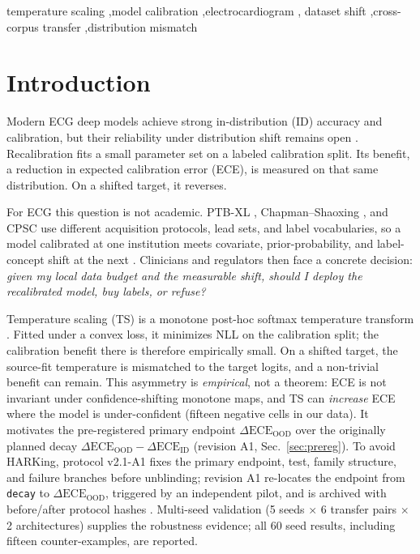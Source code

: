 \documentclass[final,5p,times,nonatbib]{elsarticle}
\begin{document}
\begin{frontmatter}
\begin{keyword}
temperature scaling \sep model calibration \sep electrocardiogram \sep
dataset shift \sep cross-corpus transfer \sep distribution mismatch
\end{keyword}

\end{frontmatter}



\section{Introduction}
\label{sec:intro}
Modern ECG deep models achieve strong in-distribution (ID) accuracy and
calibration, but their reliability under distribution shift remains open
\cite{ovadia2019calibration,guo2017calibration,wagner2020ptbxl}.
Recalibration fits a small parameter set on a labeled calibration split.
Its benefit, a reduction in expected calibration error (ECE), is measured
on that same distribution. On a shifted target, it reverses.

For ECG this question is not academic. PTB-XL \cite{wagner2020ptbxl},
Chapman--Shaoxing \cite{zheng2022ecgarrhythmia}, and CPSC use different
acquisition protocols, lead sets, and label vocabularies, so a model
calibrated at one institution meets covariate, prior-probability, and
label-concept shift at the next \cite{morenotorres2012}. Clinicians and
regulators then face a concrete decision: \emph{given my local data budget
and the measurable shift, should I deploy the recalibrated model, buy
labels, or refuse?}

Temperature scaling (TS) is a monotone post-hoc softmax temperature
transform \cite{guo2017calibration}. Fitted under a convex loss, it
minimizes NLL on the calibration split; the calibration benefit there
is therefore empirically small. On a shifted target, the source-fit
temperature is mismatched to the target logits, and a non-trivial
benefit can remain.
This asymmetry is \emph{empirical}, not a theorem: ECE is not invariant
under confidence-shifting monotone maps, and TS can \emph{increase} ECE
where the model is under-confident (fifteen negative cells in our data). It
motivates the pre-registered primary endpoint
$\Delta\text{ECE}_{\text{OOD}}$ over the originally planned decay
$\Delta\text{ECE}_{\text{OOD}}-\Delta\text{ECE}_{\text{ID}}$ (revision A1,
Sec.~\ref{sec:prereg}). To avoid HARKing, protocol v2.1-A1
\cite{protocolv21a1} fixes the primary endpoint, test, family structure,
and failure branches before unblinding; revision A1 re-locates the
endpoint from \texttt{decay} to $\Delta\text{ECE}_{\text{OOD}}$, triggered
by an independent pilot, and is archived with before/after protocol hashes
\cite{nosek2019prereg,lakens2019prereg}. Multi-seed validation
(5 seeds $\times$ 6 transfer pairs $\times$ 2 architectures) supplies the
robustness evidence; all 60 seed results, including fifteen counter-examples,
are reported.
\end{document}
